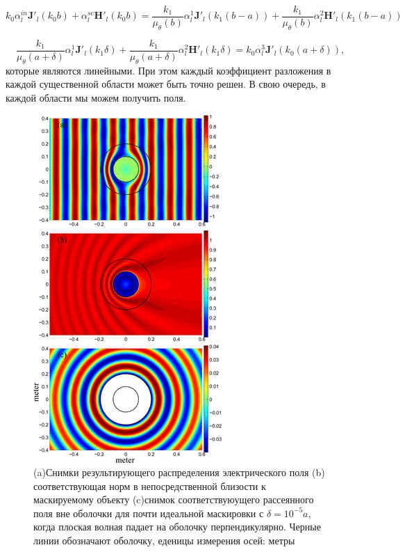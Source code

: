 \documentclass[a4paper, 12pt]{article}
\begin{document}
\begin{equation}\tag{11c}\label{e11c}
	k_0\alpha_l^{in} \mathbf{J}'_l(k_0 b) + \alpha_l^{sc} \mathbf{H'}_l(k_0 b)	=
	\frac{k_1}{\mu_\theta(b)} \alpha_l^1 \mathbf{J'}_l(k_1(b-a)) + \frac{k_1}{\mu_\theta(b)} \alpha_l^2 \mathbf{H'}_l
	(k_1(b-a)) 	
\end{equation}

\begin{equation}\tag{11d}\label{e11d}
	\frac{k_1}{\mu_\theta(a+\delta)}\alpha_l^1 \mathbf{J'}_l(k_1 \delta) + \frac{k_1}{\mu_\theta(a+\delta)}
	\alpha_l^2 \mathbf{H'}_l(k_1 \delta) = k_0\alpha_l^3 \mathbf{J'}_l(k_0(a+\delta)),
\end{equation}
которые являются линейными. При этом каждый коэффициент разложения в каждой существенной области может быть точно решен.
В свою очередь, в каждой области мы можем получить поля.

\begin{figure}[t]
  \centering
  \includegraphics[height=0.3\paperheight, width=0.22\paperwidth]{2.png}
  \caption{(a)Снимки результирующего распределения электрического поля (b) соответствующая норм в непосредственной 
  близости к маскируемому объекту (c)снимок соответствуюущего рассеянного поля вне оболочки для почти идеальной маскировки
  с $\delta = 10^{-5}a$, когда плоская волная падает на оболочку перпендикулярно. Черные линии обозначают оболочку, еденицы
  измерения осей: метры}
  \label{fig:2}
\end{figure}
\end{document}
